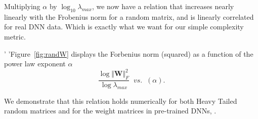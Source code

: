 

Multiplying $\alpha$ by $\log_{10}\lambda_{max}$, we now have a relation that increases nearly linearly with the 
Frobenius norm for a random matrix, and is linearly correlated for real DNN data. Which is exactly what we want for our simple complexity metric.


'
'Figure~\ref{fig:randW} displays the Forbenius norm (squared)  as a function of the power law exponent $\alpha$ 
$$
\dfrac{\log\Vert\mathbf{W}\Vert^{2}_{F}}{\log\lambda_{max}}\;\;vs.\;\;(\alpha)  .
$$


We demonstrate that this relation holds numerically for both Heavy Tailed random matrices and for the weight matrices in pre-trained DNNs, .

